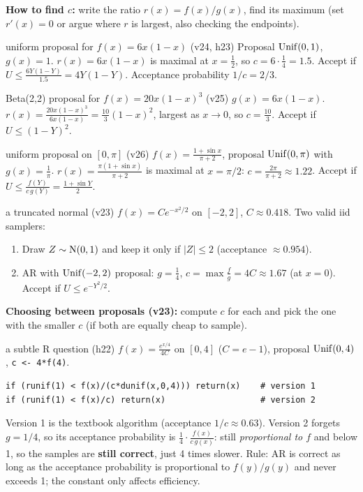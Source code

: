 \textbf{How to find $c$:} write the ratio $r(x) = f(x)/g(x)$, find its maximum (set $r'(x) = 0$ or argue where $r$ is largest, also checking the endpoints).

\begin{example}{uniform proposal for $f(x)=6x(1-x)$ (v24, h23)}
Proposal $\mathrm{Unif}(0,1)$, $g(x)=1$. $r(x) = 6x(1-x)$ is maximal at $x=\frac12$, so $c = 6\cdot\frac14 = 1.5$.
Accept if $U \le \frac{6Y(1-Y)}{1.5} = 4Y(1-Y)$. Acceptance probability $1/c = 2/3$.
\end{example}

\begin{example}{Beta(2,2) proposal for $f(x) = 20x(1-x)^3$ (v25)}
$g(x) = 6x(1-x)$. $r(x) = \frac{20x(1-x)^3}{6x(1-x)} = \frac{10}{3}(1-x)^2$, largest as $x\to 0$, so $c = \frac{10}{3}$.
Accept if $U \le (1-Y)^2$.
\end{example}

\begin{example}{uniform proposal on $[0,\pi]$ (v26)}
$f(x) = \frac{1+\sin x}{\pi+2}$, proposal $\mathrm{Unif}(0,\pi)$ with $g(x) = \frac1\pi$.
$r(x) = \frac{\pi(1+\sin x)}{\pi+2}$ is maximal at $x = \pi/2$: $c = \frac{2\pi}{\pi+2}\approx 1.22$.
Accept if $U \le \frac{f(Y)}{c\,g(Y)} = \frac{1+\sin Y}{2}$.
\end{example}

\begin{example}{a truncated normal (v23)}
$f(x) = C e^{-x^2/2}$ on $[-2,2]$, $C\approx 0.418$. Two valid iid samplers:
\begin{enumerate}
  \item Draw $Z\sim\mathrm{N}(0,1)$ and keep it only if $|Z|\le 2$ (acceptance $\approx 0.954$).
  \item AR with $\mathrm{Unif}(-2,2)$ proposal: $g = \frac14$, $c = \max\frac{f}{g} = 4C \approx 1.67$ (at $x=0$). Accept if $U \le e^{-Y^2/2}$.
\end{enumerate}
\end{example}

\textbf{Choosing between proposals (v23):} compute $c$ for each and pick the one with the smaller $c$ (if both are equally cheap to sample).

\begin{example}{a subtle R question (h22)}
$f(x)=\frac{e^{x/4}}{4C}$ on $[0,4]$ ($C=e-1$), proposal $\mathrm{Unif}(0,4)$, \texttt{c <- 4*f(4)}.
\begin{Verbatim}
if (runif(1) < f(x)/(c*dunif(x,0,4))) return(x)    # version 1
if (runif(1) < f(x)/c) return(x)                   # version 2
\end{Verbatim}
Version 1 is the textbook algorithm (acceptance $1/c\approx 0.63$). Version 2 forgets $g = 1/4$, so its acceptance probability is $\frac14\cdot\frac{f(x)}{c\,g(x)}$: still \emph{proportional to $f$} and below 1, so the samples are \textbf{still correct}, just 4 times slower. Rule: AR is correct as long as the acceptance probability is proportional to $f(y)/g(y)$ and never exceeds 1; the constant only affects efficiency.
\end{example}

